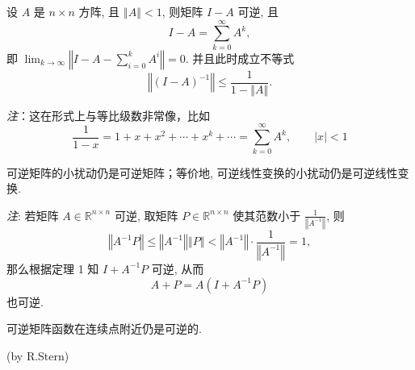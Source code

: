\begin{theorem}{}
设 $A$ 是 $n\times n$ 方阵, 且 $\left\Vert A\right\Vert <1$, 则矩阵 $I-A$
可逆, 且 
\[
I-A=\sum_{k=0}^{\infty}A^{k},
\]
即 ${\displaystyle \lim_{k\rightarrow\infty}}\left\Vert I-A-{\displaystyle \sum_{i=0}^{k}A^{i}}\right\Vert =0.$
并且此时成立不等式
\[
\left\Vert (I-A)^{-1}\right\Vert \leqslant{\displaystyle \frac{1}{1-\left\Vert A\right\Vert }.}
\]
\end{theorem}
\textsl{注}：这在形式上与等比级数非常像，比如
\[
{\displaystyle \frac{1}{1-x}=1+x+x^{2}+\cdots+x^{k}+\cdots=\sum_{k=0}^{\infty}A^{k},\quad\quad|x|<1}\]


\begin{corollary}{}
可逆矩阵的小扰动仍是可逆矩阵；等价地, 可逆线性变换的小扰动仍是可逆线性变换.
\end{corollary}

\textsl{注}: 若矩阵 $A\in\mathbb{R}^{n\times n}$ 可逆, 取矩阵 $P\in\mathbb{R}^{n\times n}$
使其范数小于 $\frac{1}{\left\Vert A^{-1}\right\Vert }$, 则
\[
\left\Vert A^{-1}P\right\Vert \leqslant\left\Vert A^{-1}\right\Vert \left\Vert P\right\Vert <\left\Vert A^{-1}\right\Vert \cdot{\displaystyle \frac{1}{\left\Vert A^{-1}\right\Vert }=1,}
\]
那么根据定理 1 知 $I+A^{-1}P$ 可逆, 从而
\[
A+P=A(I+A^{-1}P)
\]
也可逆. 

\begin{corollary}{}
可逆矩阵函数在连续点附近仍是可逆的.
\end{corollary} 

(by R.Stern)
